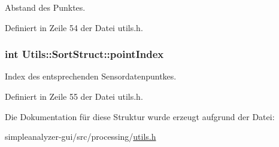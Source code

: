 Abstand des Punktes. 



Definiert in Zeile 54 der Datei utils.\-h.

\hypertarget{structUtils_1_1SortStruct_ad470a3f9a230e66a47fd022bf7a4a70e}{
\subsubsection[{point\-Index}]{\setlength{\rightskip}{0pt plus 5cm}int Utils\-::\-Sort\-Struct\-::point\-Index}}\label{structUtils_1_1SortStruct_ad470a3f9a230e66a47fd022bf7a4a70e}


Index des entsprechenden Sensordatenpuntkes. 



Definiert in Zeile 55 der Datei utils.\-h.



Die Dokumentation für diese Struktur wurde erzeugt aufgrund der Datei\-:\begin{DoxyCompactItemize}
\item 
simpleanalyzer-\/gui/src/processing/\hyperlink{utils_8h}{utils.\-h}\end{DoxyCompactItemize}
